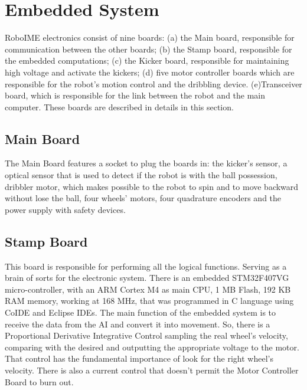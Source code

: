 \section{Embedded System}\label{emb_sys_sec}
RoboIME electronics consist of nine boards: (a) the Main board, responsible for communication between the other boards; (b) the Stamp board, responsible for the embedded computations; (c) the Kicker board, responsible for maintaining high voltage and activate the kickers; (d) five motor controller boards which are responsible for the robot's motion control and the dribbling device. (e)Transceiver board, which is responsible for the link between the robot and the main computer. These boards are described in details in this section.

\subsection{Main Board}
The Main Board features a socket to plug the boards in: the kicker's sensor, a optical sensor that is used to detect if the robot is with the ball possession, dribbler motor, which makes possible to the robot to spin and to move backward without lose the ball, four wheels' motors, four quadrature encoders and the power supply with safety devices.

\subsection{Stamp Board}
This board is responsible  for performing all the logical functions. Serving as a brain of sorts for the electronic system. There is an embedded STM32F407VG micro-controller, with an ARM Cortex M4 as main CPU, 1 MB Flash, 192 KB RAM memory, working at 168 MHz, that was programmed in C language using CoIDE and Eclipse IDEs. The main function of the embedded system is to receive the data from the AI and convert it into movement. So, there is a Proportional Derivative Integrative Control sampling the real wheel's velocity, comparing with the desired and outputting the appropriate voltage to the motor. That control has the fundamental importance of look for the right wheel's velocity. There is also a current control that doesn't permit the Motor Controller Board to burn out.

